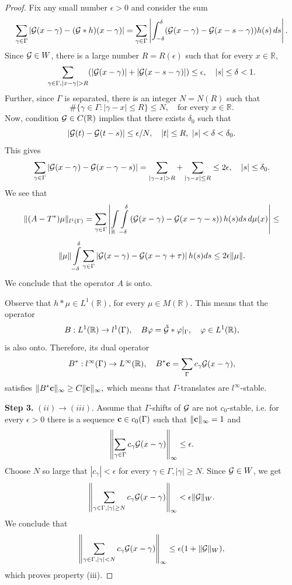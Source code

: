 \documentclass[12pt]{amsart}
\numberwithin{equation}{section}
\newcommand{\R}{{\mathbb R}} \newcommand{\Q}{{\mathbb Q}} \newcommand{\Z}{{\mathbb Z}} \newcommand{\N}{{\mathbb N}}
\begin{document}
\begin{proof}
  Fix  any small number $\epsilon>0$ and consider the sum
     $$\sum_{\gamma\in\Gamma} |\mathcal{G}(x-\gamma)-(\mathcal{G}\ast h)(x-\gamma)|=\sum_{\gamma\in\Gamma}\left|\int_{-\delta}^\delta (\mathcal{G}(x-\gamma)-\mathcal{G}(x-s-\gamma))h(s)\,ds\right|.$$ 
     Since $\mathcal{G}\in W$, there is a large number $R=R(\epsilon)$ such that   
     for every $x\in\R,$
     $$\sum_{\gamma\in\Gamma, |x-\gamma|>R}(|\Ff(x-\gamma)|+|\Ff(x-s-\gamma)|)\leq \epsilon,\quad |s|\leq\delta<1.$$
Further, since $\Gamma$ is separated, there is an integer $N=N(R)$ such that
$$\#\{\gamma\in\Gamma:|\gamma-x|\leq R\}\leq N,\quad \mbox{for every } x\in\R.$$
Now, condition $\Ff\in C(\R)$ implies that there exists  $\delta_0$ such that $$|\mathcal{G}(t)-\mathcal{G}(t-s)|\leq \epsilon/N,\quad |t|\leq R, \ |s|<\delta<\delta_0.$$
This gives
\begin{equation}\label{dif_G_gamma}
\sum_{\gamma\in\Gamma} |\Ff(x-\gamma)-\Ff(x-\gamma-s)|=\sum_{|\gamma-x|>R}+\sum_{|\gamma-x|\leq R}\leq 2\epsilon,\quad |s|\leq \delta_0.    
\end{equation}
We see that 
$$\|(A-T^\ast)\mu\|_{l^1(\Gamma)}=\sum_{\gamma\in\Gamma}\left|\int\limits_\R\int\limits_{-\delta}^\delta\left(\Ff(x-\gamma)-\Ff(x-\gamma-s)\right)h(s)ds\,d\mu(x)\right|\leq $$$$\|\mu\|\int\limits_{-\delta}^\delta\sum_{\gamma\in\Gamma} \left|\mathcal{G}(x-\gamma)-\mathcal{G}(x-\gamma+\tau)\right| h(s)ds\leq 2\epsilon\|\mu\|. $$
   We conclude that the operator $A$ is onto. 
     
     Observe that $h\ast\mu\in L^1(\R)$, for every $\mu\in M(\R)$. This means that the operator
     $$B:L^1(\R)\to l^1(\Gamma),\quad B \varphi=\check\Ff\ast\varphi|_\Gamma,\quad \varphi\in L^1(\R),$$ is also onto. Therefore, its dual operator 
     $$B^\ast: l^\infty(\Gamma)\to L^\infty(\R),\quad B^\ast {\bf c}=\sum_\Gamma c_\gamma\Ff(x-\gamma),$$ satisfies $\|B^\ast {\bf c}\|_\infty\geq C\|{\bf c}\|_\infty,$ which means that $\Gamma$-translates are $l^{\infty}$-stable.

{\noindent \bf Step 3.} $(ii)\rightarrow (iii)$. Assume that $\Gamma$-shifts of $\mathcal{G}$ are not $c_0$-stable, i.e. for every $\epsilon>0$ there is a sequence ${\bf c}\in c_0(\Gamma)$ such that $\|{\bf c}\|_\infty=1$ and $$\left\|\sum_{\gamma\in\Gamma}c_\gamma\mathcal{G}(x-\gamma)\right\|_\infty\leq\epsilon.$$ Choose $N$ so large that $|c_\gamma|<\epsilon$ for every $\gamma\in\Gamma, |\gamma|\geq N.$ Since $\mathcal{G}\in W$, we get
$$\left\|\sum_{\gamma\in\Gamma, |\gamma|\geq N}c_\gamma\mathcal{G}(x-\gamma)\right\|_\infty< \epsilon \|\mathcal{G}\|_W.$$ We conclude that
$$\left\|\sum_{\gamma\in\Gamma, |\gamma|<N}c_\gamma\mathcal{G}(x-\gamma)\right\|_\infty\leq \epsilon(1+\|\mathcal{G}\|_W),$$which proves property (iii).




\end{proof}
\end{document}
